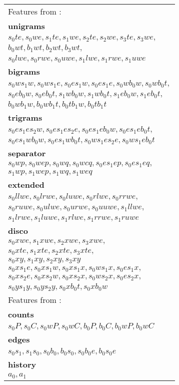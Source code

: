 \documentclass[11pt,letterpaper]{article}
\begin{document}
\begin{figure}
\begin{adjustbox}{margin=3pt,frame}
\begin{tabular}{>{\small}l}
{\footnotesize Features from \cite{zhang2009transition}:} \\
\textbf{unigrams} \\
$s_0te, s_0we, s_1te, s_1we, s_2te, s_2we, s_3te, s_3we,$ \\
$b_0wt, b_1wt, b_2wt, b_3wt,$ \\
$s_0lwe, s_0rwe, s_0uwe, s_1lwe, s_1rwe, s_1uwe$ \\
\textbf{bigrams} \\
$s_0ws_1w, s_0ws_1e, s_0es_1w, s_0es_1e, s_0wb_0w, s_0wb_0t,$ \\
$s_0eb_0w, s_0eb_0t, s_1wb_0w, s_1wb_0t, s_1eb_0w, s_1eb_0t,$ \\
$b_0wb_1w, b_0wb_1t, b_0tb_1w, b_0tb_1t$ \\
\textbf{trigrams} \\
$s_0es_1es_2w, s_0es_1es_2e, s_0es_1eb_0w, s_0es_1eb_0t,$ \\
$s_0es_1wb_0w, s_0es_1wb_0t, s_0ws_1es_2e, s_0ws_1eb_0t$ \\
\textbf{separator} \\
$s_0wp, s_0wep, s_0wq, s_0wcq, s_0es_1ep, s_0es_1eq,$ \\
$s_1wp, s_1wep, s_1wq, s_1weq$ \\

\textbf{extended} \footnotesize \cite{zhu2013fast} \\
$s_0llwe, s_0lrwe, s_0luwe, s_0rlwe, s_0rrwe,$ \\
$s_0ruwe, s_0ulwe, s_0urwe, s_0uuwe, s_1llwe,$ \\
$s_1lrwe, s_1luwe, s_1rlwe, s_1rrwe, s_1ruwe$ \\

\textbf{disco} \footnotesize \cite{maier2015discontinuous} \\
$s_0xwe, s_1xwe, s_2xwe, s_3xwe,$ \\
$s_0xte, s_1xte, s_2xte, s_3xte,$ \\
$s_0xy, s_1xy, s_2xy, s_3xy$ \\
$s_0xs_1e, s_0xs_1w, s_0xs_1x, s_0ws_1x, s_0es_1x,$ \\
$s_0xs_2e, s_0xs_2w, s_0xs_2x, s_0ws_2x, s_0es_2x,$ \\
$s_0ys_1y, s_0ys_2y, s_0xb_0t, s_0xb_0w$ \\

{\footnotesize Features from \cite{tokgoz2015transition}:} \\
\textbf{counts} \\
$s_0P, s_0C, s_0wP, s_0wC, b_0P, b_0C, b_0wP, b_0wC$ \\
\textbf{edges} \\
$s_0s_1, s_1s_0, s_0b_0, b_0s_0, s_0b_0e, b_0s_0e$ \\
\textbf{history} \\
$a_0, a_1$ \\


\end{tabular}
\end{adjustbox}
\end{figure}
\end{document}
